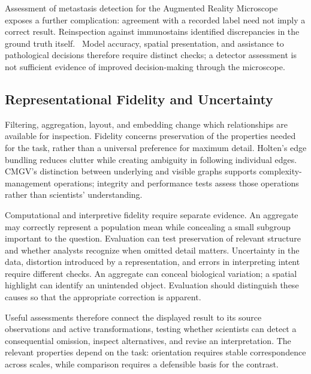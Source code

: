 Assessment of metastasis detection for the Augmented Reality Microscope exposes a further complication: agreement with a recorded label need not imply a correct result. Reinspection against immunostains identified discrepancies in the ground truth itself.~\cite{ExpansionX014} Model accuracy, spatial presentation, and assistance to pathological decisions therefore require distinct checks; a detector assessment is not sufficient evidence of improved decision-making through the microscope.

\subsection{Representational Fidelity and Uncertainty}
\label{sec:evaluation-fidelity}
Filtering, aggregation, layout, and embedding change which relationships are available for inspection. Fidelity concerns preservation of the properties needed for the task, rather than a universal preference for maximum detail. Holten's edge bundling reduces clutter while creating ambiguity in following individual edges.~\cite{EvalHolten2006} CMGV's distinction between underlying and visible graphs supports complexity-management operations; integrity and performance tests assess those operations rather than scientists' understanding.~\cite{EvalZafar2026}

Computational and interpretive fidelity require separate evidence. An aggregate may correctly represent a population mean while concealing a small subgroup important to the question. Evaluation can test preservation of relevant structure and whether analysts recognize when omitted detail matters. Uncertainty in the data, distortion introduced by a representation, and errors in interpreting intent require different checks. An aggregate can conceal biological variation; a spatial highlight can identify an unintended object. Evaluation should distinguish these causes so that the appropriate correction is apparent.

Useful assessments therefore connect the displayed result to its source observations and active transformations, testing whether scientists can detect a consequential omission, inspect alternatives, and revise an interpretation. The relevant properties depend on the task: orientation requires stable correspondence across scales, while comparison requires a defensible basis for the contrast.

